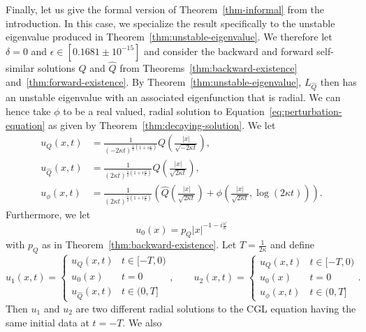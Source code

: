 \documentclass[11pt]{article}
\newcommand{\codenumber}[1]{#1}
\begin{document}
Finally, let us give the formal version of Theorem~\ref{thm-informal}
from the introduction. In this case, we specialize the result
specifically to the unstable eigenvalue produced in
Theorem~\ref{thm:unstable-eigenvalue}. We therefore let \(\delta = 0\)
and \(\epsilon \in \codenumber{[0.1681 \pm 10^{-15}]}\) and consider
the backward and forward self-similar solutions \(Q\) and \(\hat{Q}\)
from Theorems~\ref{thm:backward-existence}
and~\ref{thm:forward-existence}. By
Theorem~\ref{thm:unstable-eigenvalue}, \(L_{\hat{Q}}\) then has an
unstable eigenvalue with an associated eigenfunction that is radial.
We can hence take \(\phi\) to be a real valued, radial solution to
Equation~\eqref{eq:perturbation-equation} as given by
Theorem~\ref{thm:decaying-solution}. We let
\begin{align*}
  u_{Q}(x, t) &= \frac{1}{(-2\kappa t)^{\frac{1}{2}\left(1 + i\frac{\omega}{\kappa}\right)}}Q\left(\frac{|x|}{\sqrt{-2\kappa t}}\right),\\
  u_{\hat{Q}}(x, t) &= \frac{1}{(2\kappa t)^{\frac{1}{2}\left(1 + i\frac{\omega}{\kappa}\right)}}\hat{Q}\left(\frac{|x|}{\sqrt{2\kappa t}}\right),\\
  u_{\phi}(x, t) &= \frac{1}{(2\kappa t)^{\frac{1}{2}\left(1 + i\frac{\omega}{\kappa}\right)}}\left(\hat{Q}\left(\frac{|x|}{\sqrt{2\kappa t}}\right) + \phi\left(\frac{|x|}{\sqrt{2\kappa t}}, \log(2\kappa t)\right)\right).
\end{align*}
Furthermore, we let
\begin{equation*}
  u_{0}(x) = p_{Q}|x|^{-1 - i\frac{\omega}{\kappa}}
\end{equation*}
with \(p_{Q}\) as in Theorem~\ref{thm:backward-existence}. Let
\(T = \frac{1}{2\kappa}\) and define
\begin{equation}\label{eq:u_1-u_2}
  u_{1}(x, t) = \begin{cases}
    u_{Q}(x, t) & t \in [-T, 0)\\
    u_{0}(x) & t = 0\\
    u_{\hat{Q}}(x, t) & t \in (0, T]
  \end{cases},\qquad
  u_{2}(x, t) = \begin{cases}
    u_{Q}(x, t) & t \in [-T, 0)\\
    u_{0}(x) & t = 0\\
    u_{\phi}(x, t) & t \in (0, T]
  \end{cases}.
\end{equation}
Then \(u_{1}\) and \(u_{2}\) are two different radial solutions to the
CGL equation having the same initial data at \(t = -T\). We also
\end{document}
